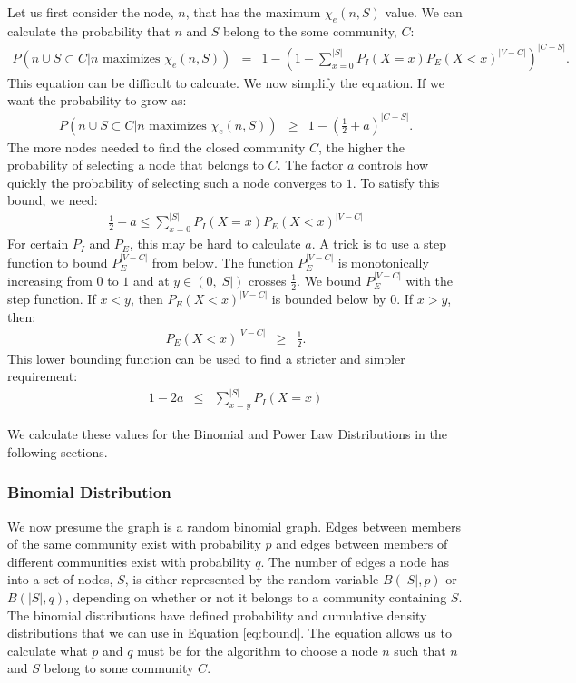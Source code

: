\documentclass[phd,tocprelim]{cornell}
\begin{document}
Let us first consider the node, $n$, that has the maximum $\chi_e(n, S)$ value.  We can calculate the probability that $n$ and $S$ belong to the some community, $C$:
\begin{eqnarray*}
 P(n \cup S \subset C | n \mbox{ maximizes } \chi_e(n, S)) &=& 1 - \left(1 - \sum\limits_{x = 0}^{|S|} P_I(X = x) P_E(X < x)^{|V - C|} \right)^{|C - S|}.
\end{eqnarray*}
This equation can be difficult to calcuate.  We now simplify the equation.  If we want the probability to grow as:
\begin{eqnarray*}
 P(n \cup S \subset C | n \mbox{ maximizes } \chi_e(n, S)) &\geq& 1 - \left( \frac{1}{2} + a \right)^{|C - S|}.
\end{eqnarray*}
The more nodes needed to find the closed community $C$, the higher the probability of selecting a node that belongs to $C$.  The factor $a$ controls how quickly the probability of selecting such a node converges to $1$.  To satisfy this bound, we need:
\begin{eqnarray*}
\frac{1}{2} - a \leq \sum\limits_{x=0}^{|S|} P_I(X = x) P_E(X < x)^{|V - C|}
\end{eqnarray*}
For certain $P_I$ and $P_E$, this may be hard to calculate $a$.  A trick is to use a step function to bound $P_E^{|V-C|}$ from below.  The function $P_E^{|V-C|}$ is monotonically increasing from $0$ to $1$ and at $y \in (0, |S|)$ crosses $\frac{1}{2}$.  We bound $P_E^{|V-C|}$ with the step function.  If $x < y$, then $P_E(X < x)^{|V - C|}$ is bounded below by $0$.  If $x > y$, then:
\begin{eqnarray*}
P_E(X < x)^{|V - C|} &\geq& \frac{1}{2} .
\end{eqnarray*}
This lower bounding function can be used to find a stricter and simpler requirement:
\begin{eqnarray*}
\label{eq:bound}
1- 2a &\leq& \sum\limits_{x=y}^{|S|} P_I(X = x) 
\end{eqnarray*}


We calculate these values for the Binomial and Power Law Distributions in the following sections.


\subsubsection{Binomial Distribution}
We now presume the graph is a random binomial graph.  Edges between members of the same community exist with probability $p$ and edges between members of different communities exist with probability $q$.  The number of edges a node has into a set of nodes, $S$, is either represented by the random variable $B(|S|, p)$ or $B(|S|, q)$, depending on whether or not it belongs to a community containing $S$.  The binomial distributions have defined probability and cumulative density distributions that we can use in Equation \ref{eq:bound}.  The equation allows us to calculate what $p$ and $q$ must be for the algorithm to choose a node $n$ such that $n$ and $S$ belong to some community $C$.
\end{document}
